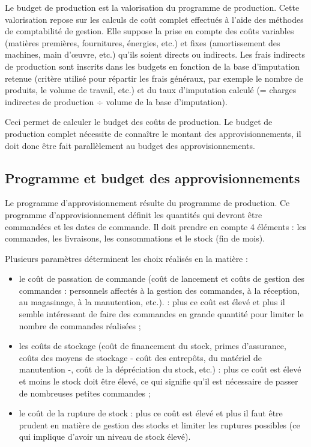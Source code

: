 \documentclass[oneside]{kaobook}
\begin{document}
Le budget de production est la valorisation du programme de production. Cette valorisation repose sur les calculs de coût complet effectués à l'aide des méthodes de comptabilité de gestion. Elle suppose la prise en compte des coûts variables (matières premières, fournitures, énergies, etc.) et fixes (amortissement des machines, main d'œuvre, etc.) qu'ils soient directs ou indirects. Les frais indirects de production sont inscrits dans les budgets en fonction de la base d'imputation retenue (critère utilisé pour répartir les frais généraux, par exemple le nombre de produits, le volume de travail, etc.) et du taux d'imputation calculé (= charges indirectes de production ÷ volume de la base d'imputation).

Ceci permet de calculer le budget des coûts de production. Le budget de production complet nécessite de connaître le montant des approvisionnements, il doit donc être fait parallèlement au budget des approvisionnements.

\subsection{Programme et budget des approvisionnements}
\label{sec:org122478f}

Le programme d'approvisionnement résulte du programme de production. Ce programme d'approvisionnement définit les quantités qui devront être commandées et les dates de commande. Il doit prendre en compte 4 éléments : les commandes, les livraisons, les consommations et le stock (fin de mois).

Plusieurs paramètres déterminent les choix réalisés en la matière :
\begin{itemize}
\item le coût de passation de commande (coût de lancement et coûts de gestion des commandes : personnels affectés à la gestion des commandes, à la réception, au magasinage, à la manutention, etc.). : plus ce coût est élevé et plus il semble intéressant de faire des commandes en grande quantité pour limiter le nombre de commandes réalisées ;
\item les coûts de stockage (coût de financement du stock, primes d'assurance, coûts des moyens de stockage - coût des entrepôts, du matériel de manutention -, coût de la dépréciation du stock, etc.) : plus ce coût est élevé et moins le stock doit être élevé, ce qui signifie qu'il est nécessaire de passer de nombreuses petites commandes ;
\item le coût de la rupture de stock : plus ce coût est élevé et plus il faut être prudent en matière de gestion des stocks et limiter les ruptures possibles (ce qui implique d'avoir un niveau de stock élevé).
\end{itemize}
\end{document}
